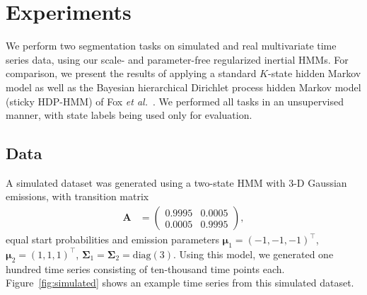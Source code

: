\documentclass[letterpaper]{article}
\begin{document}
\section{Experiments}\label{sec:Experiments}

We perform two segmentation tasks on simulated and real multivariate time series data, using our scale- and parameter-free regularized inertial HMMs. For comparison, we present the results of applying a standard $K$-state hidden Markov model as well as the Bayesian hierarchical Dirichlet process hidden Markov model (sticky HDP-HMM) of Fox \emph{et al.}~\cite{fox2011sticky}. We performed all tasks in an unsupervised manner, with state labels being used only for evaluation.

\subsection{Data}\label{sec:datasets}

A simulated dataset was generated using a two-state HMM with 3-D Gaussian emissions, with transition matrix
\begin{align*}
    \mathbf{A} &= \left( 
                   \begin{array}{ccc}
                    0.9995 & 0.0005 \\
                    0.0005 & 0.9995
                   \end{array}
                   \right),
\end{align*}
equal start probabilities and emission parameters $\mathbf{\mu}_1 = (-1, -1, -1)^\top$, $\mathbf{\mu}_2 = (1, 1, 1)^\top$, $\mathbf{\Sigma}_1 = \mathbf{\Sigma}_2 = \text{diag}(3)$. Using this model, we generated one hundred time series consisting of ten-thousand time points each. Figure~\ref{fig:simulated} shows an example time series from this simulated dataset.
\end{document}
